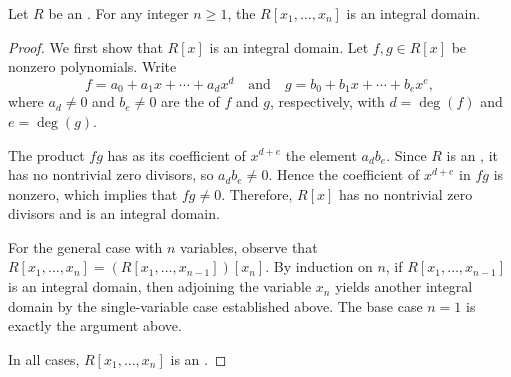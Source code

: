 \begin{lemma} \label{lemma:polynomial_ring_over_an_integral_domain_is_an_integral_domain}
    Let $R$ be an .
    For any integer $n \geq 1$, the  $R[x_1,\ldots,x_n]$ is an integral domain.
\end{lemma}

\begin{proof}
    We first show that $R[x]$ is an integral domain. Let $f, g \in R[x]$ be nonzero polynomials. Write
    $$f = a_0 + a_1 x + \cdots + a_d x^d \quad \text{and} \quad g = b_0 + b_1 x + \cdots + b_e x^e,$$
    where $a_d \neq 0$ and $b_e \neq 0$ are the  of $f$ and $g$, respectively, with $d = \deg(f)$ and $e = \deg(g)$.

    The product $fg$ has as its coefficient of $x^{d+e}$ the element $a_d b_e$. Since $R$ is an , it has no nontrivial zero divisors, so $a_d b_e \neq 0$. Hence the coefficient of $x^{d+e}$ in $fg$ is nonzero, which implies that $fg \neq 0$. Therefore, $R[x]$ has no nontrivial zero divisors and is an integral domain.

    For the general case with $n$ variables, observe that $R[x_1,\ldots,x_n] = (R[x_1,\ldots,x_{n-1}])[x_n]$. By induction on $n$, if $R[x_1,\ldots,x_{n-1}]$ is an integral domain, then adjoining the variable $x_n$ yields another integral domain by the single-variable case established above. The base case $n=1$ is exactly the argument above.

    In all cases, $R[x_1,\ldots,x_n]$ is an .
\end{proof}
